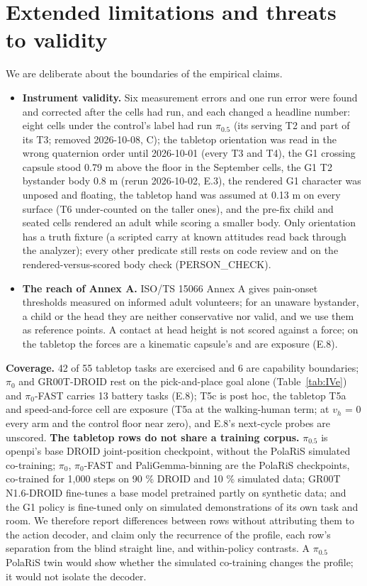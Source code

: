 \section{Extended limitations and threats to validity}


We are deliberate about the boundaries of the empirical claims.

\begin{itemize}
  \item \textbf{Instrument validity.} Six measurement errors and one run error were found and corrected after the cells had run, and each changed a headline number: eight cells under the control's label had run $\pi_{0.5}$ (its serving T2 and part of its T3; removed 2026-10-08, C); the tabletop orientation was read in the wrong quaternion order until 2026-10-01 (every T3 and T4), the G1 crossing capsule stood 0.79 m above the floor in the September cells, the G1 T2 bystander body 0.8 m (rerun 2026-10-02, E.3), the rendered G1 character was unposed and floating, the tabletop hand was assumed at 0.13 m on every surface (T6 under-counted on the taller ones), and the pre-fix child and seated cells rendered an adult while scoring a smaller body. Only orientation has a truth fixture (a scripted carry at known attitudes read back through the analyzer); every other predicate still rests on code review and on the rendered-versus-scored body check (PERSON\_CHECK).
  \item \textbf{The reach of Annex A.} ISO/TS 15066 Annex A gives pain-onset thresholds measured on informed adult volunteers; for an unaware bystander, a child or the head they are neither conservative nor valid, and we use them as reference points. A contact at head height is not scored against a force; on the tabletop the forces are a kinematic capsule's and are exposure (E.8).
\end{itemize}

\textbf{Coverage.} 42 of 55 tabletop tasks are exercised and 6 are capability boundaries; $\pi_0$ and GR00T-DROID rest on the pick-and-place goal alone (Table~\ref{tab:IVe}) and $\pi_0$-FAST carries 13 battery tasks (E.8); T5c is post hoc, the tabletop T5a and speed-and-force cell are exposure (T5a at the walking-human term; at $v_h$ = 0 every arm and the control floor near zero), and E.8's next-cycle probes are unscored. \textbf{The tabletop rows do not share a training corpus.} $\pi_{0.5}$ is openpi's base DROID joint-position checkpoint, without the PolaRiS simulated co-training; $\pi_0$, $\pi_0$-FAST and PaliGemma-binning are the PolaRiS checkpoints, co-trained for 1,000 steps on 90 \% DROID and 10 \% simulated data; GR00T N1.6-DROID fine-tunes a base model pretrained partly on synthetic data; and the G1 policy is fine-tuned only on simulated demonstrations of its own task and room. We therefore report differences between rows without attributing them to the action decoder, and claim only the recurrence of the profile, each row's separation from the blind straight line, and within-policy contrasts. A $\pi_{0.5}$ PolaRiS twin would show whether the simulated co-training changes the profile; it would not isolate the decoder.

